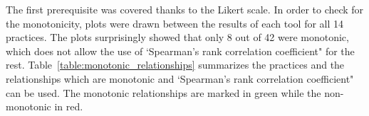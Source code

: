The first prerequisite was covered thanks to the Likert scale. In order to check for the monotonicity, plots were drawn between the results of each tool for all 14 practices. The plots surprisingly showed that only 8 out of 42 were monotonic, which does not allow the use of `Spearman’s rank correlation coefficient" for the rest. Table~\ref{table:monotonic_relationships} summarizes the practices and the relationships which are monotonic and `Spearman’s rank correlation coefficient" can be used. The monotonic relationships are marked in green while the non-monotonic in red.

\newenvironment{mntnc_itemize} 
{ 
	\begin{itemize}
    \setlength{\itemsep}{0pt}  
    \setlength{\parskip}{0pt}  
}
{ \end{itemize}  }

